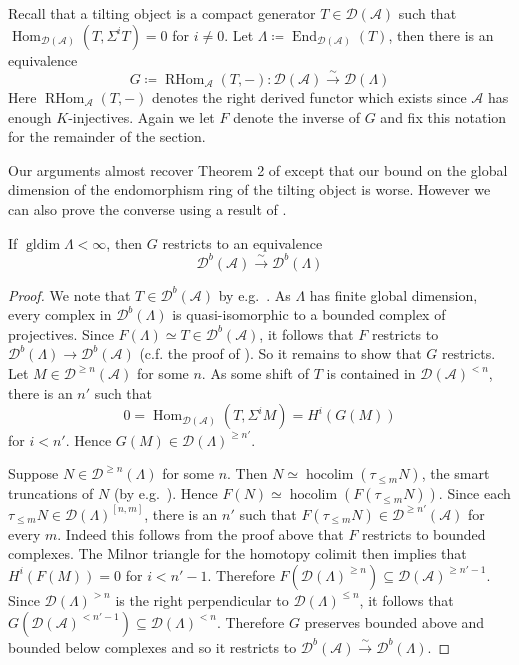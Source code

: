 \documentclass[12pt,oneside]{amsart}
\DeclareMathOperator*{\hocolim}{hocolim}
\DeclareMathOperator{\Hom}{Hom}
\DeclareMathOperator{\RHom}{RHom}
\DeclareMathOperator{\End}{End}
\DeclareMathOperator{\gldim}{gldim}
\begin{document}
\begin{remark}
Recall that a tilting object is a compact generator $T \in \mathcal{D}(\mathcal{A})$ such that $\Hom_{\mathcal{D}(\mathcal{A})}(T,\Sigma^i T) = 0$ for $i \neq 0$. Let $\Lambda \coloneq \End_{\mathcal{D}(\mathcal{A})}(T)$, then there is an equivalence
\[
G\coloneq \RHom_{\mathcal{A}}(T,-): \mathcal{D}(\mathcal{A}) \xrightarrow{\sim} \mathcal{D}( \Lambda)
\]
Here $\RHom_{\mathcal{A}}(T,-)$ denotes the right derived functor which exists since $\mathcal{A}$ has enough $K$-injectives. Again we let $F$ denote the inverse of $G$ and fix this notation for the remainder of the section.
\end{remark}

Our arguments almost recover Theorem 2 of \cite{BK20} except that our bound on the global dimension of the endomorphism ring of the tilting object is worse. However we can also prove the converse using a result of \cite{Pos26}.

\begin{lemma} \label{boundrestrict}
If $\gldim \Lambda < \infty$, then $G$ restricts to an equivalence 
\[
\mathcal{D}^b(\mathcal{A}) \xrightarrow{\sim} \mathcal{D}^b(\Lambda)
\]
\end{lemma}

\begin{proof}
We note that $T \in \mathcal{D}^b(\mathcal{A})$ by e.g.\ \cite[Lemma 7]{BK20}. As $\Lambda$ has finite global dimension, every complex in $\mathcal{D}^b(\Lambda)$ is quasi-isomorphic to a bounded complex of projectives. Since $F(\Lambda) \simeq T \in \mathcal{D}^b(\mathcal{A})$, it follows that $F$ restricts to $\mathcal{D}^b(\Lambda) \to \mathcal{D}^b(\mathcal{A})$ (c.f. the proof of \cite[Lemma 8]{BK20}). So it remains to show that $G$ restricts. Let $M \in \mathcal{D}^{\geq n}(\mathcal{A})$ for some $n$. As some shift of $T$ is contained in $\mathcal{D}(\mathcal{A})^{< n}$, there is an $n'$ such that 
\[
0 = \Hom_{\mathcal{D}(\mathcal{A})}(T, \Sigma^i M) = H^i(G(M))
\]
for $i < n'$. Hence $G(M) \in \mathcal{D}(\Lambda)^{\geq n'}$. 

Suppose $N \in \mathcal{D}^{\geq n}(\Lambda)$ for some $n$. Then $N \simeq \hocolim(\tau_{\leq m} N)$, the smart truncations of $N$ (by e.g.\ \cite[Lemma 4]{BK20}). Hence $F(N) \simeq \hocolim(F(\tau_{\leq m} N))$. Since each $\tau_{\leq m} N \in \mathcal{D}(\Lambda)^{[n,m]}$, there is an $n'$ such that $F(\tau_{\leq m} N) \in \mathcal{D}^{\geq n'}(\mathcal{A})$ for every $m$. Indeed this follows from the proof above that $F$ restricts to bounded complexes. The Milnor triangle for the homotopy colimit then implies that $H^i(F(M)) = 0$ for $i < n'-1$. Therefore $F(\mathcal{D}(\Lambda)^{\geq n}) \subseteq \mathcal{D}(\mathcal{A})^{\geq n' -1}$. Since $\mathcal{D}(\Lambda)^{> n}$ is the right perpendicular to $\mathcal{D}(\Lambda)^{\leq n}$, it follows that $G(\mathcal{D}(\mathcal{A})^{< n'-1}) \subseteq \mathcal{D}(\Lambda)^{< n}$. Therefore $G$ preserves bounded above and bounded below complexes and so it restricts to $\mathcal{D}^b(\mathcal{A}) \xrightarrow{\sim} \mathcal{D}^b(\Lambda)$. 
\end{proof}
\end{document}
